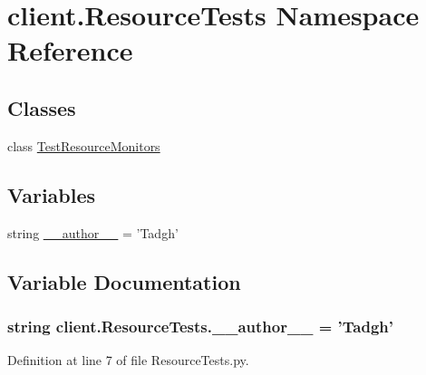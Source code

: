 \hypertarget{namespaceclient_1_1_resource_tests}{\section{client.\-Resource\-Tests Namespace Reference}
\label{namespaceclient_1_1_resource_tests}
}
\subsection*{Classes}
\begin{DoxyCompactItemize}
\item 
class \hyperlink{classclient_1_1_resource_tests_1_1_test_resource_monitors}{Test\-Resource\-Monitors}
\end{DoxyCompactItemize}
\subsection*{Variables}
\begin{DoxyCompactItemize}
\item 
string \hyperlink{namespaceclient_1_1_resource_tests_a69befa02aa81b89c00cad77ab29d88bb}{\-\_\-\-\_\-author\-\_\-\-\_\-} = 'Tadgh'
\end{DoxyCompactItemize}


\subsection{Variable Documentation}
\hypertarget{namespaceclient_1_1_resource_tests_a69befa02aa81b89c00cad77ab29d88bb}{
\subsubsection[{\-\_\-\-\_\-author\-\_\-\-\_\-}]{\setlength{\rightskip}{0pt plus 5cm}string client.\-Resource\-Tests.\-\_\-\-\_\-author\-\_\-\-\_\- = 'Tadgh'}}\label{namespaceclient_1_1_resource_tests_a69befa02aa81b89c00cad77ab29d88bb}


Definition at line 7 of file Resource\-Tests.\-py.

